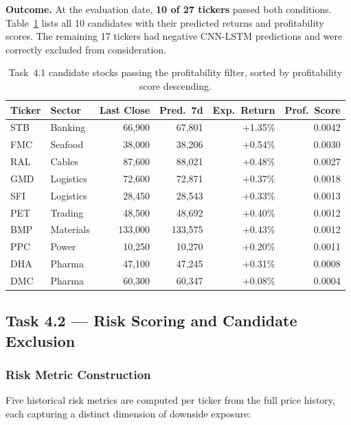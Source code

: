 \documentclass[12pt, a4paper]{article}
\begin{document}
\textbf{Outcome.} At the evaluation date, \textbf{10 of 27 tickers}
passed both conditions. Table~\ref{tab:candidates} lists all 10
candidates with their predicted returns and profitability scores.
The remaining 17 tickers had negative CNN-LSTM predictions and were
correctly excluded from consideration.

\begin{table}[h]
\centering
\caption{Task~4.1 candidate stocks passing the profitability filter,
         sorted by profitability score descending.}
\label{tab:candidates}
\renewcommand{\arraystretch}{1.3}
\begin{tabular}{llrrrr}
\hline
\textbf{Ticker} & \textbf{Sector}
  & \textbf{Last Close} & \textbf{Pred.\ 7d}
  & \textbf{Exp.\ Return} & \textbf{Prof.\ Score} \\
\hline
STB & Banking    & 66,900 & 67,801 & +1.35\% & 0.0042 \\
FMC & Seafood    & 38,000 & 38,206 & +0.54\% & 0.0030 \\
RAL & Cables     & 87,600 & 88,021 & +0.48\% & 0.0027 \\
GMD & Logistics  & 72,600 & 72,871 & +0.37\% & 0.0018 \\
SFI & Logistics  & 28,450 & 28,543 & +0.33\% & 0.0013 \\
PET & Trading    & 48,500 & 48,692 & +0.40\% & 0.0012 \\
BMP & Materials  & 133,000 & 133,575 & +0.43\% & 0.0012 \\
PPC & Power      & 10,250 & 10,270 & +0.20\% & 0.0011 \\
DHA & Pharma     & 47,100 & 47,245 & +0.31\% & 0.0008 \\
DMC & Pharma     & 60,300 & 60,347 & +0.08\% & 0.0004 \\
\hline
\end{tabular}
\end{table}





\subsection{Task 4.2 --- Risk Scoring and Candidate Exclusion}

\subsubsection{Risk Metric Construction}

Five historical risk metrics are computed per ticker from the
full price history, each capturing a distinct dimension of downside
exposure:
\end{document}
